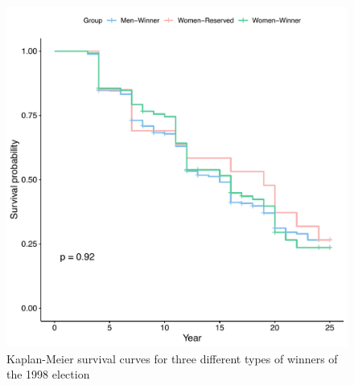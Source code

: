 \begin{figure}[]

    \includegraphics[width=0.4\columnwidth]{figures/1998-winner-survival.pdf}

    \caption{Kaplan-Meier survival curves for three different types of winners of the 1998 election}
    \label{fig:1998-winner-survival}

\end{figure}